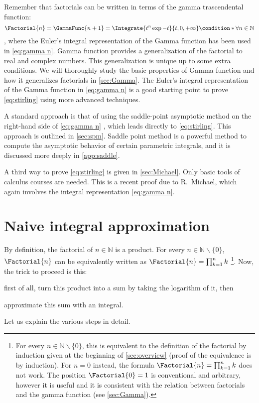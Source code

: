 \documentclass[onecolumn,a4paper,11pt]{article}
\newcommand{\numberset}{\mathbb}
\providecommand{\N}{\numberset{N}}
\theoremstyle{classicdef}
\theoremstyle{remark}
\begin{document}
Remember that factorials can be written in terms of the gamma trascendental
function:
\begin{dmath}[label={gamma n}, compact]
   \Factorial{n} = \GammaFunc{n+1} = \Integrate{t^{n} \exp{-t}}{t, 0, +\infty} 
\condition*{\forall n \in \N}
\end{dmath},
where the Euler's integral representation of the Gamma function has been used in
\cref{eq:gamma n}.  Gamma function provides a generalization of the factorial to
real and complex numbers. This generalization is unique up to some extra
conditions.  We will thoroughly study the basic properties of Gamma function and
how it generalizes factorials in \cref{sec:Gamma}.  The Euler's integral
representation of the Gamma function in \cref{eq:gamma n} is a good starting
point to prove \cref{eq:stirling} using more advanced techniques.

A standard approach is that of using the saddle-point asymptotic method on the
right-hand side of \cref{eq:gamma n} , which leads directly to
\cref{eq:stirling}.  This approach is outlined in \cref{sec:spm}.  Saddle point
method is a powerful method to compute the asymptotic behavior of certain
parametric integrals, and it  is discussed more deeply in \cref{app:saddle}.

A third way to prove \cref{eq:stirling} is given in \cref{sec:Michael}. Only
basic  tools of calculus courses are needed. This is a recent proof due to
R.~Michael, which again involves the integral representation \cref{eq:gamma n}.

\section{Naive integral approximation\label{sec:int bounds}}

By definition, the factorial of $n\in\N$ is a product.  For every
$n\in\N\backslash\{0\}$,  $\Factorial{n}$ can be equivalently written as
$\Factorial{n} = \prod_{k=1}^{n} k$%
\footnote{%
   For every $n\in\N\backslash\{0\}$, this is equivalent to the definition of
   the factorial by induction given at the beginning of \cref{sec:overview}
   (proof of the equivalence is by induction). For $n=0$ instead, the formula
   $\Factorial{n} = \prod_{k=1}^{n} k$  does not work.  
   The position $\Factorial{0}=1$ is conventional and
   arbitrary, however it is useful and it is consistent with the relation
   between factorials and the gamma function (see \cref{sec:Gamma}).
}.
Now, the trick to proceed is this: 
\begin{inparaenum}[(a)]
\item first of all, turn this product into a sum by taking the logarithm of it,
   then
\item approximate this sum with an integral.  
\end{inparaenum} 
Let us explain the various steps in detail.
\end{document}
